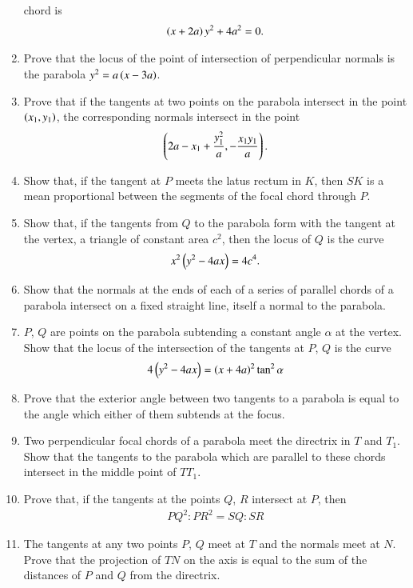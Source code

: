 \begin{enumerate}[1.]
chord is
\begin{align*}
\left(x+2a\right)y^2+4a^2=0.
\end{align*}
\item Prove that the locus of the point of intersection of perpendicular normals
is the parabola $y^2=a\left(x-3a\right)$.
\item Prove that if the tangents at two points on the parabola intersect in
the point $\left(x_1,y_1\right)$, the corresponding normals intersect in the
point 
\begin{align*}
\left(2a-x_1+\frac{y_1^2}{a},-\frac{x_1y_1}{a}\right).
\end{align*}
\item Show that, if the tangent at $P$ meets the latus rectum in $K$, then $SK$ is a mean
proportional between the segments of the focal chord through $P$.
\item Show that, if the tangents from $Q$ to the parabola form with the tangent at the vertex,
a triangle of constant area $c^2$, then the locus
of $Q$ is the curve
\begin{align*}
x^2\left(y^2-4ax\right) = 4c^4.
\end{align*}
\item Show that the normals at the ends of each of a series of parallel chords of a parabola intersect
on a fixed straight line, itself a normal to the parabola.
\item $P$, $Q$ are points on the parabola subtending a constant angle
$\alpha$ at the vertex.  Show that the locus of the intersection of the tangents
at $P$, $Q$ is the curve 
\begin{align*}
4\left(y^2-4ax\right) = \left(x+4a\right)^2\tan^2\alpha
\end{align*}
\item Prove that the exterior angle between two tangents to a parabola is equal to the
angle which either of them subtends at the focus.
\item Two perpendicular focal chords of a parabola meet the directrix in $T$ and $T_1$.
Show that the tangents to the parabola which are parallel to these chords intersect in the middle point of $TT_1$.
\item Prove that, if the tangents at the points $Q$, $R$ intersect at $P$, then 
\begin{align*}
PQ^2:PR^2=SQ:SR
\end{align*}
\item The tangents at any two points $P$, $Q$ meet at $T$ and the normals meet at $N$.  Prove that the projection
of $TN$ on the axis is equal to the sum of the distances of $P$ and $Q$ from the directrix.

\end{enumerate}
